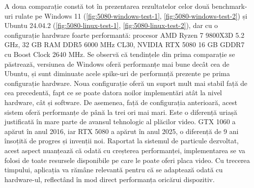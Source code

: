 A doua comparație constă tot în prezentarea rezultatelor celor două benchmark-uri rulate pe Windows 11 (\autoref{fig:5080-windows-test-1}, \autoref{fig:5080-windows-test-2}) și Ubuntu 24.04.2 (\autoref{fig:5080-linux-test-1}, \autoref{fig:5080-linux-test-2}), dar cu o configurație hardware foarte performantă: procesor AMD Ryzen 7 9800X3D 5.2 GHz, 32 GB RAM DDR5 6000 MHz CL30, NVIDIA RTX 5080 16 GB GDDR7 cu Boost Clock 2640 MHz. Se observă că tendințele din prima comparație se păstrează, versiunea de Windows oferă performanțe mai bune decât cea de Ubuntu, și sunt diminuate acele spike-uri de performnță prezente pe prima configurație hardware. Noua configurație oferă un suport mult mai stabil față de cea precedentă, fapt ce se poate datora noilor implementări atât la nivel hardware, cât și software. De asemenea, față de configurația anterioară, acest sistem oferă performanțe de până la trei ori mai mari. Este o diferență uriașă justificată în mare parte de avansul tehnologic al plăcilor video. GTX 1060 a apărut în anul 2016, iar RTX 5080 a apărut în anul 2025, o diferență de 9 ani însoțită de progres și invenții noi. Raportat la sistemul de particule dezvoltat, acest aspect nuanțează că odată cu creșterea performanței, implementarea se va folosi de toate resursele disponibile pe care le poate oferi placa video. Cu trecerea timpului, aplicația va rămâne relevantă pentru că se adaptează odată cu hardware-ul, reflectând în mod direct performanța oricărui dispozitiv. 


